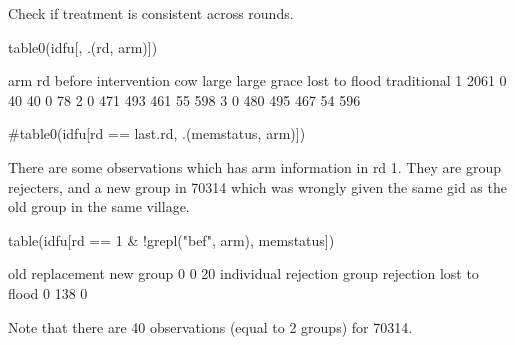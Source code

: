 Check if treatment is consistent across rounds.
\begin{Schunk}
\begin{Sinput}
table0(idfu[, .(rd, arm)])
\end{Sinput}
\begin{Soutput}
   arm
rd  before intervention  cow large large grace lost to flood traditional
  1                2061    0    40          40             0          78
  2                   0  471   493         461            55         598
  3                   0  480   495         467            54         596
\end{Soutput}
\begin{Sinput}
#table0(idfu[rd == last.rd, .(memstatus, arm)])
\end{Sinput}
\end{Schunk}
There are some observations which has \textsf{arm} information in rd 1. They are group rejecters, and a new group in 70314 which was wrongly given the same \textsf{gid} as the old group in the same village. 
\begin{Schunk}
\begin{Sinput}
table(idfu[rd == 1 & !grepl("bef", arm), memstatus])
\end{Sinput}
\begin{Soutput}

                 old          replacement            new group 
                   0                    0                   20 
individual rejection      group rejection        lost to flood 
                   0                  138                    0 
\end{Soutput}
\end{Schunk}
Note that there are 40 observations (equal to 2 groups) for 70314.
